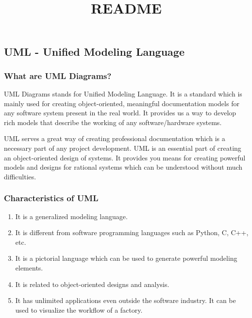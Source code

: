 \documentclass[
]{article}
\title{README}
\author{}
\date{}
\providecommand{\tightlist}{%
  \setlength{\itemsep}{0pt}\setlength{\parskip}{0pt}}
\begin{document}
\maketitle

\hypertarget{uml---unified-modeling-language}{%
\subsection{UML - Unified Modeling
Language}\label{uml---unified-modeling-language}}

\hypertarget{what-are-uml-diagrams}{%
\subsubsection{What are UML Diagrams?}\label{what-are-uml-diagrams}}

UML Diagrams stands for Unified Modeling Language. It is a standard
which is mainly used for creating object-oriented, meaningful
documentation models for any software system present in the real world.
It provides us a way to develop rich models that describe the working of
any software/hardware systems.

UML serves a great way of creating professional documentation which is a
necessary part of any project development. UML is an essential part of
creating an object-oriented design of systems. It provides you means for
creating powerful models and designs for rational systems which can be
understood without much difficulties.

\hypertarget{characteristics-of-uml}{%
\subsubsection{Characteristics of UML}\label{characteristics-of-uml}}

\begin{enumerate}
\def\labelenumi{\arabic{enumi}.}
\tightlist
\item
  It is a generalized modeling language.
\item
  It is different from software programming languages such as Python, C,
  C++, etc.
\item
  It is a pictorial language which can be used to generate powerful
  modeling elements.
\item
  It is related to object-oriented designs and analysis.
\item
  It has unlimited applications even outside the software industry. It
  can be used to visualize the workflow of a factory.
\end{enumerate}
\end{document}
